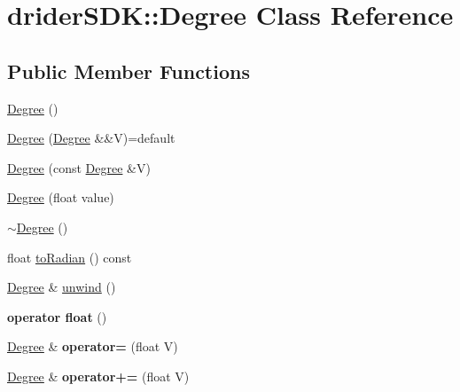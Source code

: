 \hypertarget{classdrider_s_d_k_1_1_degree}{}\section{drider\+S\+DK\+:\+:Degree Class Reference}
\label{classdrider_s_d_k_1_1_degree}
\subsection*{Public Member Functions}
\begin{DoxyCompactItemize}
\item 
\hyperlink{classdrider_s_d_k_1_1_degree_aa02a04e5e7f0c5d15e4362bfc2022286}{Degree} ()
\item 
\hyperlink{classdrider_s_d_k_1_1_degree_ab8798b0761abe03fd0d28abbac62a17c}{Degree} (\hyperlink{classdrider_s_d_k_1_1_degree}{Degree} \&\&V)=default
\item 
\hyperlink{classdrider_s_d_k_1_1_degree_a94a3842a811edb51f578d4f6da487e3b}{Degree} (const \hyperlink{classdrider_s_d_k_1_1_degree}{Degree} \&V)
\item 
\hyperlink{classdrider_s_d_k_1_1_degree_ada0c9ad7f00c36d1209fc1e7794911d7}{Degree} (float value)
\item 
\hyperlink{classdrider_s_d_k_1_1_degree_a44a8904fbd4178de2916c2b54883c1e1}{$\sim$\+Degree} ()
\item 
float \hyperlink{classdrider_s_d_k_1_1_degree_a5904a76d6c28c10ca432ee46db1997a8}{to\+Radian} () const
\item 
\hyperlink{classdrider_s_d_k_1_1_degree}{Degree} \& \hyperlink{classdrider_s_d_k_1_1_degree_a5f35502afbc09417969d83f2381cc59f}{unwind} ()
\item 
\mbox{\label{classdrider_s_d_k_1_1_degree_abf1e9a263d6e3acaebd79f1f1f6e4791}} 
{\bfseries operator float} ()
\item 
\mbox{\label{classdrider_s_d_k_1_1_degree_a4320abb846750e3ea3de34895e56dc03}} 
\hyperlink{classdrider_s_d_k_1_1_degree}{Degree} \& {\bfseries operator=} (float V)
\item 
\mbox{\label{classdrider_s_d_k_1_1_degree_a06e5895da5d163da2753a7f05f3e3e56}} 
\hyperlink{classdrider_s_d_k_1_1_degree}{Degree} \& {\bfseries operator+=} (float V)
\item 

\end{DoxyCompactItemize}
